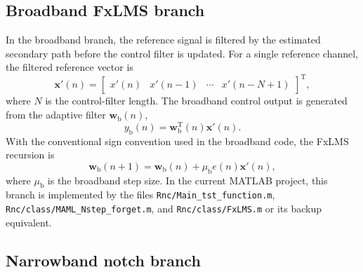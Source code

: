 \documentclass{internoise2026}
\begin{document}
\subsection{Broadband FxLMS branch}

In the broadband branch, the reference signal is filtered by the estimated secondary path before the control filter is updated. For a single reference channel, the filtered reference vector is
\begin{equation}
  \mathbf{x}'(n)=
  \begin{bmatrix}
    x'(n) & x'(n-1) & \cdots & x'(n-N+1)
  \end{bmatrix}^{\mathrm{T}},
  \label{eq:filtered_reference}
\end{equation}
where $N$ is the control-filter length. The broadband control output is generated from the adaptive filter $\mathbf{w}_{\mathrm{b}}(n)$,
\begin{equation}
  y_{\mathrm{b}}(n) = \mathbf{w}_{\mathrm{b}}^{\mathrm{T}}(n)\mathbf{x}'(n).
  \label{eq:broadband_output}
\end{equation}
With the conventional sign convention used in the broadband code, the FxLMS recursion is
\begin{equation}
  \mathbf{w}_{\mathrm{b}}(n+1)
  = \mathbf{w}_{\mathrm{b}}(n) + \mu_{\mathrm{b}} e(n)\mathbf{x}'(n),
  \label{eq:fxlms}
\end{equation}
where $\mu_{\mathrm{b}}$ is the broadband step size. In the current MATLAB project, this branch is implemented by the files \texttt{Rnc/Main\_tst\_function.m}, \texttt{Rnc/class/MAML\_Nstep\_forget.m}, and \texttt{Rnc/class/FxLMS.m} or its backup equivalent.

\subsection{Narrowband notch branch}
\end{document}
